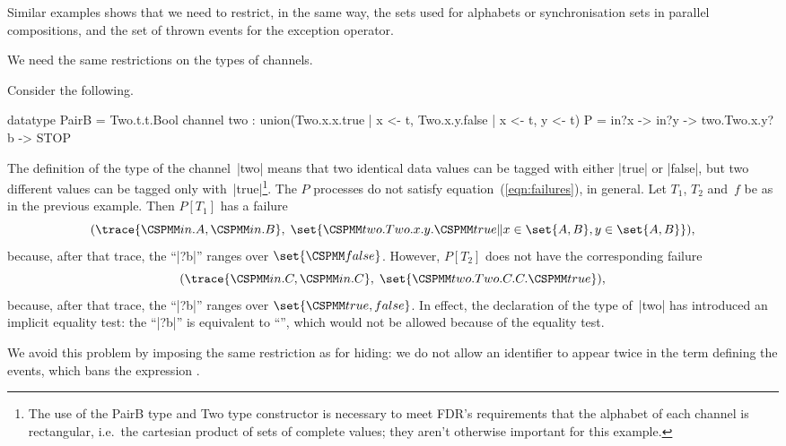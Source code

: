 Similar examples shows that we need to restrict, in the same way, the sets
used for alphabets or synchronisation sets in parallel compositions, and the
set of thrown events for the exception operator.

We need the same restrictions on the types of channels.  
%
\begin{example}
Consider the following.
\begin{cspm}
datatype PairB = Two.t.t.Bool
channel two : union({Two.x.x.true | x <- t}, {Two.x.y.false | x <- t, y <- t})
P = in?x -> in?y -> two.Two.x.y?b -> STOP
\end{cspm}
%
The definition of the type of the channel~|two| means that two identical data
values can be tagged with either |true| or |false|, but two different values
can be tagged only with~|true|\footnote{The use of the {\cspmfont PairB} type
and {\cspmfont Two} type constructor is necessary to meet FDR's requirements
that the alphabet of each channel is rectangular, i.e.~the cartesian product
of sets of complete values; they aren't otherwise important for this
example.}.  The $P$ processes do not satisfy equation~(\ref{eqn:failures}), in
general.  Let $T_1$, $T_2$ and~$f$ be as in the previous example.  Then
$P[T_1]$ has a failure
\[
(\trace{\M{in}.A, \M{in}.B},\; 
  \set{\M{two.Two}.x.y.\M{true} \| x \in \set{A,B}, y \in \set{A,B}}),
\]
because, after that trace, the ``|?b|'' ranges over $\set{\M{false}}$.  
However,  $P[T_2]$ does not have the corresponding failure
\[
(\trace{\M{in}.C, \M{in}.C},\; \set{\M{two.Two}.C.C.\M{true}}),
\]
because, after that trace, the ``|?b|'' ranges over $\set{\M{true,false}}$.
In effect, the declaration of the type of~|two| has introduced an implicit
equality test: the ``|?b|'' is equivalent to ``'', which would not be allowed because of
the equality test.
\end{example}


We avoid this problem by imposing the same restriction as for hiding: we do
not allow an identifier to appear twice in the term defining the events, which
bans the expression .




